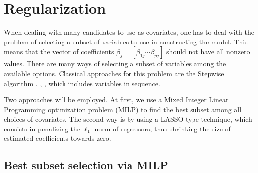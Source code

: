 \section{Regularization} \label{sec:regularization}

When dealing with many candidates to use as covariates, one has to deal with the problem of selecting a subset of variables to use in constructing the model. 
This means that the vector of coefficients $\beta_j = [ \beta_{1 j} \cdots \beta_{pj} ]$ should not have all nonzero values.
There are many ways of selecting a subset of variables among the available options.
Classical approaches for this problem are the Stepwise algorithm \cite{efroymson1960multiple}, \cite{hocking_selection_1967}, \cite{tibshirani1996regression}, which includes variables in sequence. 

Two approaches will be employed. At first, we use a Mixed Integer Linear Programming optimization problem (MILP) to find the best subset among all choices of covariates. The second way is by using a LASSO-type technique, which consists in penalizing the $\ell_1$-norm of regressors, thus shrinking the size of estimated coefficients towards zero.  

\subsection{Best subset selection via MILP}
\label{sec:best-subset-mip}

